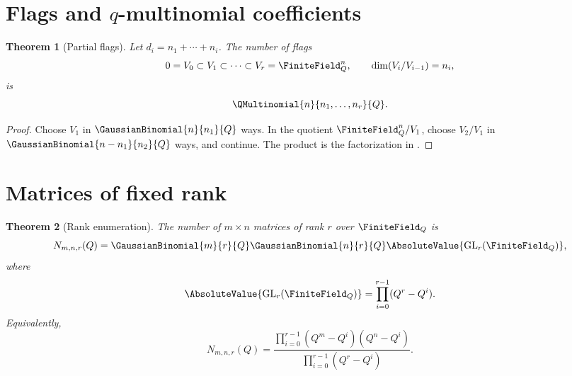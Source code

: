 \documentclass[11pt,a4paper,oneside,openany]{book}
\newtheorem{theorem}{Theorem}[chapter]
\theoremstyle{definition}
\theoremstyle{remark}
\begin{document}
\section{Flags and \texorpdfstring{$q$}{q}-multinomial coefficients}

\begin{theorem}[Partial flags]\label{thm:flag-count}
Let $d_i=n_1+\cdots+n_i$.  The number of flags
\[
 0=V_0\subset V_1\subset\cdots\subset V_r=\FiniteField_{Q}^{n},
 \qquad \dim(V_i/V_{i-1})=n_i,
\]
is
\[
 \QMultinomial{n}{n_1,\dots,n_r}{Q}.
\]
\end{theorem}

\begin{proof}
Choose $V_1$ in $\GaussianBinomial{n}{n_1}{Q}$ ways.  In the quotient $\FiniteField_{Q}^{n}/V_1$, choose $V_2/V_1$ in $\GaussianBinomial{n-n_1}{n_2}{Q}$ ways, and continue.  The product is the factorization in .
\end{proof}

\section{Matrices of fixed rank}

\begin{theorem}[Rank enumeration]\label{thm:rank-matrices}
The number of $m\times n$ matrices of rank $r$ over $\FiniteField_{Q}$ is
\[
 N_{m,n,r}(Q)
 =\GaussianBinomial{m}{r}{Q}\GaussianBinomial{n}{r}{Q}\AbsoluteValue{\mathrm{GL}_r(\FiniteField_{Q})},
\]
where
\[
 \AbsoluteValue{\mathrm{GL}_r(\FiniteField_{Q})}=\prod_{i=0}^{r-1}(Q^r-Q^i).
\]
Equivalently,
\[
 N_{m,n,r}(Q)
 =\frac{\prod_{i=0}^{r-1}(Q^m-Q^i)(Q^n-Q^i)}
 {\prod_{i=0}^{r-1}(Q^r-Q^i)}.
\]
\end{theorem}
\end{document}
